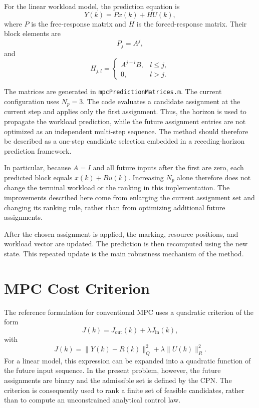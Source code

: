 For the linear workload model, the prediction equation is
\begin{equation}
	Y(k) = P x(k) + H U(k),
\end{equation}
where $P$ is the free-response matrix and $H$ is the forced-response
matrix. Their block elements are
\begin{equation}
	P_j = A^j,
\end{equation}
and
\begin{equation}
	H_{j,l} =
	\begin{cases}
		A^{j-l}B, & l \leq j,\\
		0, & l>j.
	\end{cases}
\end{equation}

The matrices are generated in \texttt{mpcPredictionMatrices.m}. The current
configuration uses $N_p=3$. The code evaluates a candidate assignment at the
current step and applies only the first assignment. Thus, the horizon is used
to propagate the workload prediction, while the future assignment entries
are not optimized as an independent multi-step sequence. The method should
therefore be described as a one-step candidate selection embedded in a
receding-horizon prediction framework.

In particular, because $A=I$ and all future inputs after the first are zero,
each predicted block equals $x(k)+Bu(k)$. Increasing $N_p$ alone therefore
does not change the terminal workload or the ranking in this implementation.
The improvements described here come from enlarging the current assignment
set and changing its ranking rule, rather than from optimizing additional
future assignments.

After the chosen assignment is applied, the marking, resource positions, and
workload vector are updated. The prediction is then recomputed using the new
state. This repeated update is the main robustness mechanism of the method.

\section{MPC Cost Criterion}

The reference formulation for conventional MPC uses a quadratic criterion of
the form
\begin{equation}
	J(k) = J_{\mathrm{out}}(k) + \lambda J_{\mathrm{in}}(k),
\end{equation}
with
\begin{equation}
	J(k) =
	\|Y(k)-R(k)\|_Q^2
	+ \lambda\|U(k)\|_R^2.
\end{equation}
For a linear model, this expression can be expanded into a quadratic function
of the future input sequence. In the present problem, however, the future
assignments are binary and the admissible set is defined by the CPN. The
criterion is consequently used to rank a finite set of feasible candidates,
rather than to compute an unconstrained analytical control law.

